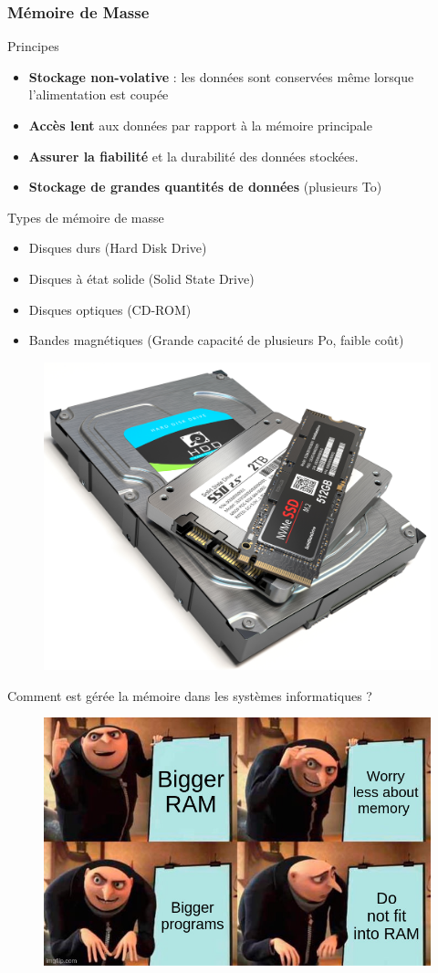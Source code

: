 \documentclass[8pt]{beamer}
\begin{document}
\begin{frame}
    \frametitle{Mémoire de Masse}
    \begin{block}{Principes}
        \begin{itemize}
            \item \textbf{Stockage non-volative} : les données sont conservées
                  même lorsque l'alimentation est coupée
            \item \textbf{Accès lent} aux données par rapport à la mémoire
                  principale
            \item \textbf{Assurer la fiabilité} et la durabilité des données
                  stockées.
            \item \textbf{Stockage de grandes quantités de données} (plusieurs
                  To)

        \end{itemize}
    \end{block}
    \begin{exampleblock}{Types de mémoire de masse}
        \begin{itemize}
            \item Disques durs (Hard Disk Drive)
            \item Disques à état solide (Solid State Drive)
            \item Disques optiques (CD-ROM)
            \item Bandes magnétiques (Grande capacité de plusieurs Po, faible
                  coût)
        \end{itemize}
    \end{exampleblock}
    \begin{figure}
        \centering
        \includegraphics[width=.25\textwidth]{figures/HDD+SSD.png}
    \end{figure}
\end{frame}

\begin{frame}{Comment est gérée la mémoire dans les systèmes informatiques ?}
    \begin{figure}
        \centering
        \includegraphics[width=.75\textwidth]{figures/RAM_meme.jpg}
    \end{figure}
\end{frame}
\end{document}
